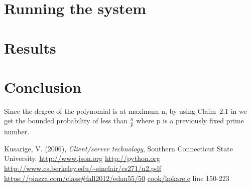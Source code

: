 \documentclass{article}
\begin{document}
\section{Running the system}

\section{Results}

\section{Conclusion}

Since the degree of the polynomial is at maximum n, by using Claim~2.1 in \cite[p.~2-1]{alistair} we get the bounded probability of less than $\frac{n}{p}$ where p is a previously fixed prime number.

\newpage

\begin{thebibliography}{9}
Kusarige, V. (2006), \emph{Client/server technology}, Southern Connecticut State University.
\url{http://www.json.org}
\url{http://python.org}
\url{http://www.cs.berkeley.edu/~sinclair/cs271/n2.pdf}
\url{https://piazza.com/class#fall2012/edan55/50}
\url{cook/kokare.c} line 150-223
\end{thebibliography}
\end{document}
